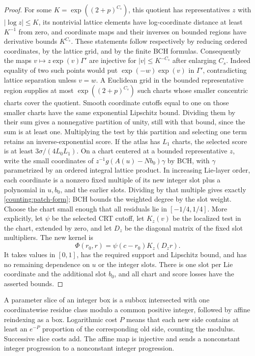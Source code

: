 \begin{proof}
For some $K=\exp((2+p)^{C_s})$, this quotient has representatives
$z$ with $|\log z|\leq K$, its nontrivial lattice elements have
log-coordinate distance at least $K^{-1}$ from zero, and coordinate
maps and their inverses on bounded regions have derivative bounds
$K^{C_s}$.  These statements follow respectively by reducing ordered
coordinates, by the lattice grid, and by the finite BCH formulas.
Consequently the maps $v\mapsto z\exp(v)\Gamma'$ are injective for
$|v|\leq K^{-C_s}$ after enlarging $C_s$.  Indeed equality of two
such points would put $\exp(-w)\exp(v)$ in $\Gamma'$, contradicting
lattice separation unless $v=w$.  A Euclidean grid in the bounded
representative region supplies at most $\exp((2+p)^{C_s})$ such
charts whose smaller concentric charts cover the quotient.  Smooth
coordinate cutoffs equal to one on those smaller charts have the
same exponential Lipschitz bound.  Dividing them by their sum gives
a nonnegative partition of unity, still with that bound, since the
sum is at least one.  Multiplying the test by this partition and
selecting one term retains an inverse-exponential score.  If the atlas has $L_1$ charts, the selected score is at least
$3\sigma/(4L_0L_1)$.  On a chart centered at a bounded
representative $z$, write the small coordinates of
$z^{-1}g(A(u)-Nb_0)\gamma$ by BCH, with $\gamma$ parametrized by an
ordered integral lattice product.  In increasing Lie-layer order, each
coordinate is a nonzero fixed multiple of its new integer slot plus a
polynomial in $u,b_0$, and the earlier slots.  Dividing by that multiple
gives exactly \eqref{counting:patch-form}; BCH bounds the weighted degree
by the slot weight.  Choose the chart small enough that all residuals
lie in $[-1/4,1/4]$.  More explicitly, let $\psi$ be the selected CRT
cutoff, let $K_z(v)$ be the localized test in the chart, extended by zero,
and let $D_z$ be the diagonal matrix of the fixed slot multipliers.
The new kernel is
\[
 \Phi(r_0,r)=\psi(c-r_0)K_z(D_zr).
\]
It takes values in $[0,1]$, has the required support and Lipschitz
bound, and has no remaining dependence on $u$ or the integer slots.
There is one slot per Lie coordinate and the additional slot $b_0$,
and all chart and score losses have the asserted bounds.
\end{proof}

\begin{definition}\label{counting:slice}
A parameter slice of an integer box is a subbox intersected with one
coordinatewise residue class modulo a common positive integer, followed
by affine reindexing as a box.  Logarithmic cost $P$ means that each new
side contains at least an $e^{-P}$ proportion of the corresponding old
side, counting the modulus.  Successive slice costs add.  The affine map
is injective and sends a nonconstant integer progression to a
nonconstant integer progression.
\end{definition}

